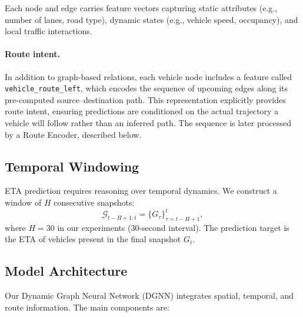 Each node and edge carries feature vectors capturing static attributes (e.g., number of lanes, road type), dynamic states (e.g., vehicle speed, occupancy), and local traffic interactions.

\paragraph{Route intent.}
In addition to graph-based relations, each vehicle node includes a feature called \texttt{vehicle\_route\_left}, which encodes the sequence of upcoming edges along its pre-computed source--destination path. 
This representation explicitly provides route intent, ensuring predictions are conditioned on the actual trajectory a vehicle will follow rather than an inferred path. 
The sequence is later processed by a Route Encoder, described below.

\subsection{Temporal Windowing}
ETA prediction requires reasoning over temporal dynamics. We construct a window of $H$ consecutive snapshots:
\[
\mathcal{G}_{t-H+1:t} = \{G_\tau\}_{\tau=t-H+1}^t,
\]
where $H=30$ in our experiments (30-second interval). The prediction target is the ETA of vehicles present in the final snapshot $G_t$.

\subsection{Model Architecture}
Our Dynamic Graph Neural Network (DGNN) integrates spatial, temporal, and route information. The main components are:

